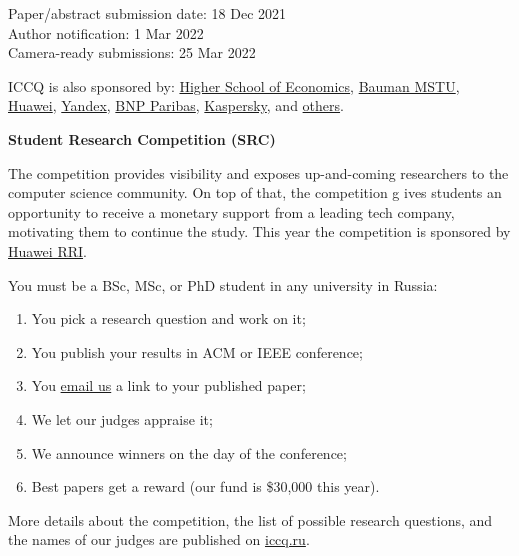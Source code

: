 \documentclass{../cfp}
\begin{document}
\begin{adjustwidth}{1.5in}{0pt}
\vspace{6pt}
Paper/abstract submission date: 18 Dec 2021 \\
Author notification: 1 Mar 2022 \\
Camera-ready submissions: 25 Mar 2022

\vspace{6pt}
ICCQ is also sponsored by:
\href{https://www.hse.ru/en/}{Higher School of Economics},
\href{https://bmstu.ru/en/}{Bauman MSTU},
\href{https://www.huawei.com/}{Huawei},
\href{https://yandex.com/company/}{Yandex},
\href{https://www.linkedin.com/company/btechrussia}{BNP Paribas},
\href{https://www.kaspersky.com/}{Kaspersky},
and \href{https://www.iccq.ru/2022.html#partners}{others}.
\end{adjustwidth}

\newpage

{\color{xred}\bfseries{\Large Student Research Competition (SRC)}}

The competition provides visibility and exposes up-and-coming
researchers to the computer science community. On top of that, the competition g
ives students an opportunity to receive a monetary support from a leading tech
company, motivating them to continue the study.
This year the competition is sponsored by \href{https://career.huawei.ru/rri/}{Huawei RRI}.

You must be a BSc, MSc, or PhD student in any university in Russia:

\begin{enumerate}
\item You pick a research question and work on it;
\item You publish your results in ACM or IEEE conference;
\item You \href{mailto:src@iccq.ru}{email us} a link to your published paper;
\item We let our judges appraise it;
\item We announce winners on the day of the conference;
\item Best papers get a reward (our fund is \$30,000 this year).
\end{enumerate}

More details about the competition, the list of possible research questions,
and the names of our judges are published on \href{https://www.iccq.ru}{iccq.ru}.
\end{document}

